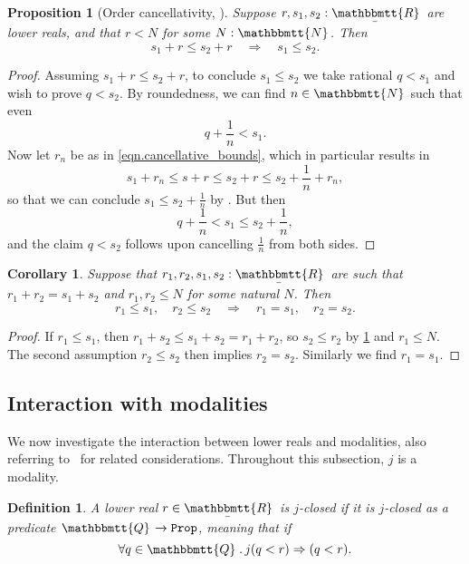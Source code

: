 \documentclass[reqno,11pt]{amsproc}
\theoremstyle{plain}
\newtheorem{proposition}[theorem]{Proposition}
\newtheorem{corollary}[theorem]{Corollary}
\newtheorem{definition}[theorem]{Definition}
\theoremstyle{definition}
\newcommand{\Const}[1]{\mathtt{#1}}
\renewcommand{\to}[1][]{\xrightarrow{#1}}
\newcommand{\ubar}[1]{\underaccent{\bar}{#1}}
\newcommand{\internal}[1]{\raisebox{-.03ex}{$\mathbbmtt{#1}$}}
\newcommand{\hs}{\hspace{1pt}}
\newcommand{\tnn}{\internal{N}\hs}
\newcommand{\tqq}{\internal{Q}\hs}
\newcommand{\trr}{\internal{R}}
\newcommand{\tlrr}{\ubar{\trr}\hs}
\newcommand{\prop}{\Const{Prop}}
\newcommand{\imp}{\Rightarrow}
\numberwithin{equation}{section}
\begin{document}
\begin{proposition}[Order cancellativity, \cite{henry2012simplification}]\label{cor.order_cancel}
	Suppose $r,s_1,s_2:\tlrr$ are lower reals, and that $r<N$ for some $N:\tnn$. Then
	\[
		s_1 + r \le s_2 + r \quad \Longrightarrow \quad s_1 \le s_2.
	\]
\end{proposition}

\begin{proof}
	Assuming $s_1 + r \le s_2 + r$, to conclude $s_1 \le s_2$ we take rational $q < s_1$ and wish to prove $q < s_2$. By roundedness, we can find $n \in \tnn$ such that even
	\[
		q + \frac{1}{n} < s_1.
	\]
	Now let $r_n$ be as in \eqref{eqn.cancellative_bounds}, which in particular results in
	\[
		s_1 + r_n \le s + r \le s_2 + r \le s_2 + \frac{1}{n} + r_n,
	\]
	so that we can conclude $s_1 \le s_2 + \frac{1}{n}$ by . But then
	\[
		q + \frac{1}{n} < s_1 \le s_2 + \frac{1}{n},
	\]
	and the claim $q < s_2$ follows upon cancelling $\frac{1}{n}$ from both sides.
\end{proof}

\begin{corollary}\label{cor.favorite}
	Suppose that $r_1,r_2,s_1,s_2:\tlrr$ are such that $r_1 + r_2 = s_1 + s_2$ and $r_1, r_2 \le N$ for some natural $N$. Then
	\[
		r_1\le s_1, \quad r_2\le s_2 \quad \Longrightarrow \quad r_1 = s_1, \quad r_2 = s_2.
	\]
\end{corollary}

\begin{proof}
	If $r_1 \le s_1$, then $r_1 + s_2 \le s_1 + s_2 = r_1 + r_2$, so $s_2 \le r_2$ by \cref{cor.order_cancel} and $r_1 \le N$. The second assumption $r_2 \le s_2$ then implies $r_2 = s_2$. Similarly we find $r_1 = s_1$.
\end{proof}

\subsection{Interaction with modalities}

We now investigate the interaction between lower reals and modalities, also referring to~\cite[Section~4.3]{schultz2019temporal} for related considerations. Throughout this subsection, $j$ is a modality.

\begin{definition}
	A lower real $r \in \tlrr$ is \emph{$j$-closed} if it is $j$-closed as a predicate $\tqq \to \prop$, meaning that if
	\[
		\forall q \in \tqq \, . \, j(q < r) \imp (q < r).
	\]
\end{definition}
\end{document}

